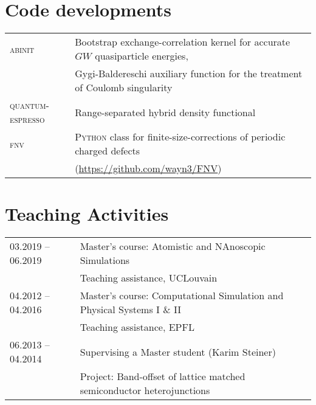 \documentclass[a4paper, 11pt, DIV=15,headings=normal]{scrartcl}
\begin{document}
\section*{Code developments}
\begin{tabular}{ll}
\textsc{abinit}  & Bootstrap exchange-correlation kernel for accurate $GW$ quasiparticle energies, \\
                 & Gygi-Baldereschi auxiliary function for the treatment of
Coulomb singularity \\
\textsc{quantum-espresso} & Range-separated hybrid density functional \\
\textsc{fnv}     & \textsc{Python} class for finite-size-corrections of
periodic charged defects \\
                 & (\url{https://github.com/wayn3/FNV})
\\
\end{tabular} 

\section*{Teaching Activities}
\begin{tabular}{ll}
03.2019 -- 06.2019 & Master's course: Atomistic and NAnoscopic Simulations \\
                   & Teaching assistance, UCLouvain\\
04.2012 -- 04.2016 & Master's course: Computational Simulation and Physical Systems I \& II \\
                   & Teaching assistance, EPFL\\
06.2013 -- 04.2014 & Supervising a Master student (Karim Steiner) \\
                   & Project: Band-offset of lattice matched semiconductor heterojunctions 
\end{tabular}
\end{document}

